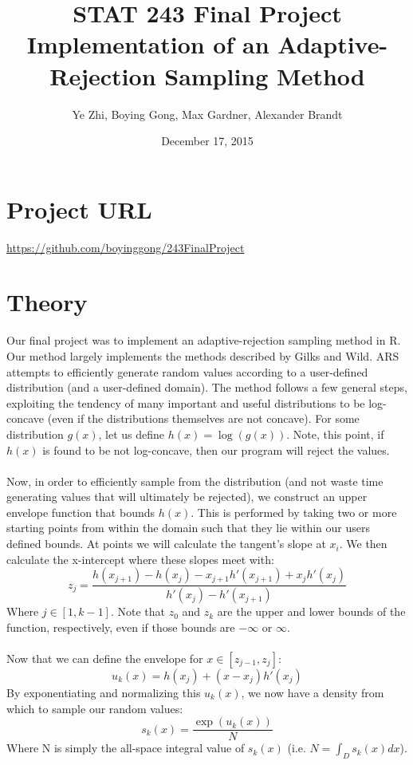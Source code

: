 \documentclass[12pt, oneside]{article}
\title{STAT 243 Final Project\\Implementation of an Adaptive-Rejection Sampling Method}
\author{Ye Zhi, Boying Gong, Max Gardner, Alexander Brandt}
\date{December 17, 2015}
\begin{document}
\maketitle

\section{Project URL}

\url{https://github.com/boyinggong/243FinalProject}

\section{Theory}

Our final project was to implement an adaptive-rejection sampling method in R.  Our method largely implements the methods described by Gilks and Wild.  ARS attempts to efficiently generate random values according to a user-defined distribution (and a user-defined domain).  The method follows a few general steps, exploiting the tendency of many important and useful distributions to be log-concave (even if the distributions themselves are not concave).  For some distribution \(g(x)\), let us define \(h(x) = \log(g(x))\).  Note, this point, if \(h(x)\) is found to be not log-concave, then our program will reject the values.
\\\\
Now, in order to efficiently sample from the distribution (and not waste time generating values that will ultimately be rejected), we construct an upper envelope function that bounds \(h(x)\).  This is performed by taking two or more starting points from within the domain such that they lie within our users defined bounds.  At points we will calculate the tangent's slope at \(x_i\).  We then calculate the x-intercept where these slopes meet with:
\[ z_j = \frac{h(x_{j+1}) - h(x_j) - x_{j+1}h'(x_{j+1}) + x_j h'(x_j)}{h'(x_j) - h'(x_{j+1})} \]
Where \(j \in [1,k-1]\).  Note that \(z_0\) and \(z_k\) are the upper and lower bounds of the function, respectively, even if those bounds are \(-\infty\) or \(\infty\).
\\\\
Now that we can define the envelope for \(x \in [z_{j-1}, z_j]\):
\[ u_k(x) = h(x_j) + (x - x_j)h'(x_j) \]
By exponentiating and normalizing this \(u_k(x)\), we now have a density from which to sample our random values:
\[ s_k(x) = \frac{\exp(u_k(x))}{N} \]
Where N is simply the all-space integral value of \(s_k(x)\) (i.e. \(N = \int_D s_k(x) dx \)).
\end{document}
